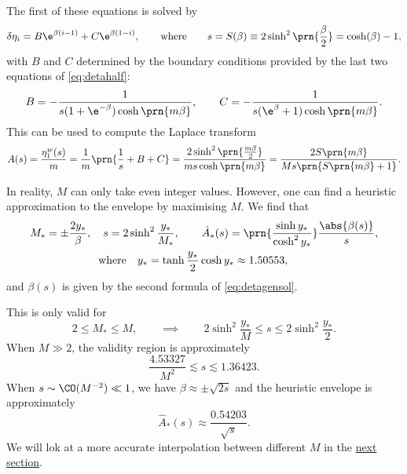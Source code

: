 \documentclass[12pt]{article}
\newcommand{\etwm}{\eta^w}
\begin{document}
The first of these equations is solved by
%
\begin{equation}\label{eq:detagensol}
  \delta\eta_i = B\e^{\beta(i-1)} + C\e^{\beta(1-i)},
  \qquad\text{where}\qquad
  s = S(\beta) \equiv 2 \sinh^2 \prn{\frac{\beta}{2}}
    = \cosh (\beta) - 1,
\end{equation}
%
with \(B\) and \(C\) determined by the boundary conditions provided by the last two equations of \eqref{eq:detahalf}:
%
\begin{equation}\label{eq:unicoeffs}
  B = -\frac{1}{s(1 + \e^{-\beta}) \cosh \prn{m \beta}},
  \qquad
  C = -\frac{1}{s(\e^{\beta} + 1) \cosh \prn{m \beta}}.
\end{equation}
%
This can be used to compute the Laplace transform
%
\begin{equation}\label{eq:unilaplace}
  A(s) = \frac{\etwm_1(s)}{m}
   = \frac{1}{m}\prn{\frac{1}{s}+B+C}
   = \frac{2\sinh^2\prn{\frac{m \beta}{2}}}{m s \cosh\prn{m \beta}}
   = \frac{2 S\prn{m \beta}}{M s \prn{S\prn{m \beta} + 1}}.
\end{equation}
%

In reality, \(M\) can only take even integer values.
However, one can find a heuristic approximation to the envelope by maximising \wrt \(M\).
We find that
%
\begin{multline}\label{eq:unienv}
  M_* = \pm\frac{2y_*}{\beta},
  \quad
  s = 2\sinh^2\frac{y_*}{M_*},
  \qquad
  \hat{A}_*(s) = \prn{\frac{ \sinh y_* }{ \cosh^2 y_* }} 
      \frac{\abs{\beta(s)}}{s},
  \\ \text{where}\quad
  y_* = \tanh \frac{y_*}{2} \cosh y_* \approx 1.50553,
  \qquad
\end{multline}
%
and \(\beta(s)\) is given by the second formula of \cref{eq:detagensol}.

This is only valid for
%
\begin{equation}\label{eq:univalid}
  2 \leq M_* \leq M,
  \qquad\implies\qquad
  2\sinh^2 \frac{y_*}{M} \leq s \leq 2\sinh^2 \frac{y_*}{2}.
\end{equation}
%
When \(M \gg 2\), the validity region is approximately
%
\begin{equation}\label{eq:univalidapprox}
  \frac{4.53327}{M^2} \lesssim s \lesssim 1.36423.
\end{equation}
%
When \(s \sim \CO(M^{-2}) \ll 1\), we have \(\beta \approx \pm \sqrt{2s}\) and the heuristic envelope is approximately
%
\begin{equation}\label{eq:unienvapprox}
  \hat{A}_*(s) \approx \frac{ 0.54203 }{ \sqrt{s} }.
\end{equation}
%
We will lok at a more accurate interpolation between different \(M\) in the \hyperref[sec:serial_shorten]{next section}.
\end{document}
